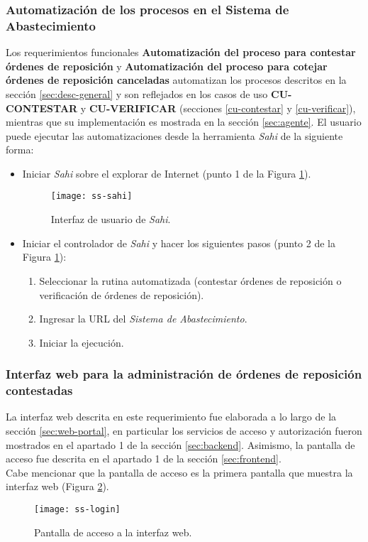 \subsubsection{Automatización de los procesos en el Sistema de Abastecimiento}
Los requerimientos funcionales \textbf{Automatización del proceso para contestar órdenes de reposición} y \textbf{Automatización del proceso para cotejar órdenes de reposición canceladas} automatizan los procesos descritos en la sección \ref{sec:desc-general} y son reflejados en los casos de uso \textbf{CU-CONTESTAR} y \textbf{CU-VERIFICAR} (secciones \ref{cu-contestar} y \ref{cu-verificar}), mientras que su implementación es mostrada en la sección \ref{sec:agente}. El usuario puede ejecutar las automatizaciones desde la herramienta \textit{Sahi} de la siguiente forma:
\begin{itemize}
	\item Iniciar \textit{Sahi} sobre el explorar de Internet (punto 1 de la Figura \ref{fig:ss-sahi}).
	\begin{figure}[h]
		\centering
		\texttt{[image: ss-sahi]}
		\caption{Interfaz de usuario de \textit{Sahi}.}
		\label{fig:ss-sahi}
	\end{figure}

	\item Iniciar el controlador de \textit{Sahi} y hacer los siguientes pasos (punto 2 de la Figura \ref{fig:ss-sahi}):
	\begin{enumerate}
		\item Seleccionar la rutina automatizada (contestar órdenes de reposición o verificación de órdenes de reposición).
		\item Ingresar la URL del \textit{Sistema de Abastecimiento}.
		\item Iniciar la ejecución.
	\end{enumerate}
\end{itemize}
\subsubsection{Interfaz web para la administración de órdenes de reposición contestadas}
La interfaz web descrita en este requerimiento fue elaborada a lo largo de la sección \ref{sec:web-portal}, en particular los servicios de acceso y autorización fueron mostrados en el apartado 1 de la sección \ref{sec:backend}. Asimismo, la pantalla de acceso fue descrita en el apartado 1 de la sección \ref{sec:frontend}.\\
Cabe mencionar que la pantalla de acceso es la primera pantalla que muestra la interfaz web (Figura \ref{fig:ss-login}).
\begin{figure}[h]
	\centering
	\texttt{[image: ss-login]}
	\caption{Pantalla de acceso a la interfaz web.}
	\label{fig:ss-login}
\end{figure}
